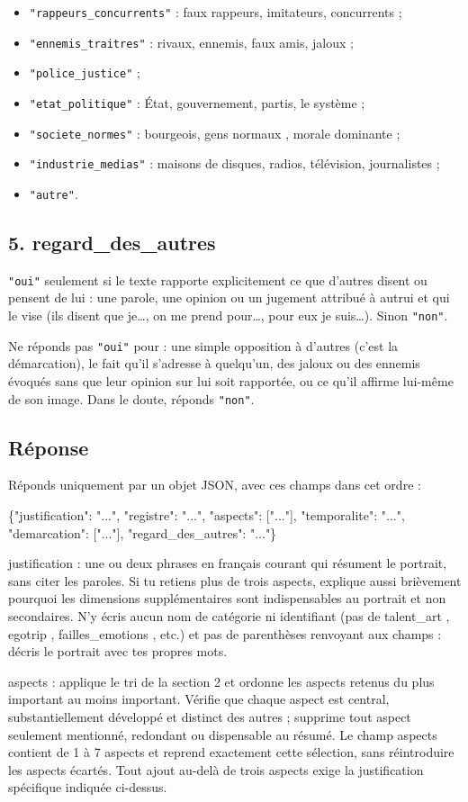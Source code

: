 \begin{itemize}
\item \texttt{"rappeurs\_concurrents"} : faux rappeurs, imitateurs, concurrents ;
\item \texttt{"ennemis\_traitres"} : rivaux, ennemis, faux amis, jaloux ;
\item \texttt{"police\_justice"} ;
\item \texttt{"etat\_politique"} : État, gouvernement, partis, \og le système \fg{} ;
\item \texttt{"societe\_normes"} : bourgeois, gens \og normaux \fg{}, morale dominante ;
\item \texttt{"industrie\_medias"} : maisons de disques, radios, télévision, journalistes ;
\item \texttt{"autre"}.
\end{itemize}

\subsection*{5. regard\_des\_autres}
\texttt{"oui"} seulement si le texte rapporte explicitement ce que d'autres disent ou pensent de lui : une parole, une opinion ou un jugement attribué à autrui et qui le vise (\og ils disent que je\ldots \fg{}, \og on me prend pour\ldots \fg{}, \og pour eux je suis\ldots \fg{}). Sinon \texttt{"non"}.

Ne réponds pas \texttt{"oui"} pour : une simple opposition à d'autres (c'est la démarcation), le fait qu'il s'adresse à quelqu'un, des jaloux ou des ennemis évoqués sans que leur opinion sur lui soit rapportée, ou ce qu'il affirme lui-même de son image. Dans le doute, réponds \texttt{"non"}.

\subsection*{Réponse}
Réponds uniquement par un objet JSON, avec ces champs dans cet ordre :

{\raggedright\ttfamily
\{"justification": "...", "registre": "...", "aspects": ["..."],
"temporalite": "...", "demarcation": ["..."], "regard\_des\_autres": "..."\}\par}

justification : une ou deux phrases en français courant qui résument le portrait, sans citer les paroles. Si tu retiens plus de trois aspects, explique aussi brièvement pourquoi les dimensions supplémentaires sont indispensables au portrait et non secondaires. N'y écris aucun nom de catégorie ni identifiant (pas de \og talent\_art \fg{}, \og egotrip \fg{}, \og failles\_emotions \fg{}, etc.) et pas de parenthèses renvoyant aux champs : décris le portrait avec tes propres mots.

aspects : applique le tri de la section 2 et ordonne les aspects retenus du plus important au moins important. Vérifie que chaque aspect est central, substantiellement développé et distinct des autres ; supprime tout aspect seulement mentionné, redondant ou dispensable au résumé. Le champ \og aspects \fg{} contient de 1 à 7 aspects et reprend exactement cette sélection, sans réintroduire les aspects écartés. Tout ajout au-delà de trois aspects exige la justification spécifique indiquée ci-dessus.
\endgroup
